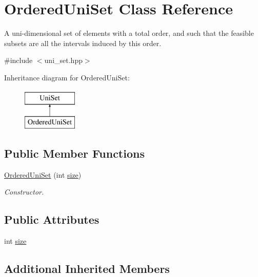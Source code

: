 \hypertarget{classOrderedUniSet}{\section{Ordered\-Uni\-Set Class Reference}
\label{classOrderedUniSet}
}


A uni-\/dimensional set of elements with a total order, and such that the feasible subsets are all the intervals induced by this order.  




{\ttfamily \#include $<$uni\-\_\-set.\-hpp$>$}

Inheritance diagram for Ordered\-Uni\-Set\-:\begin{figure}[H]
\begin{center}
\leavevmode
\includegraphics[height=2.000000cm]{classOrderedUniSet}
\end{center}
\end{figure}
\subsection*{Public Member Functions}
\begin{DoxyCompactItemize}
\item 
\hyperlink{classOrderedUniSet_ac09b90d14eda5aed31fcb11114591ef5}{Ordered\-Uni\-Set} (int \hyperlink{classOrderedUniSet_ae0c3867ab74ade7469492b48742adb2a}{size})
\begin{DoxyCompactList}\small\item\em Constructor. \end{DoxyCompactList}\end{DoxyCompactItemize}
\subsection*{Public Attributes}
\begin{DoxyCompactItemize}
\item 
int \hyperlink{classOrderedUniSet_ae0c3867ab74ade7469492b48742adb2a}{size}
\end{DoxyCompactItemize}
\subsection*{Additional Inherited Members}


